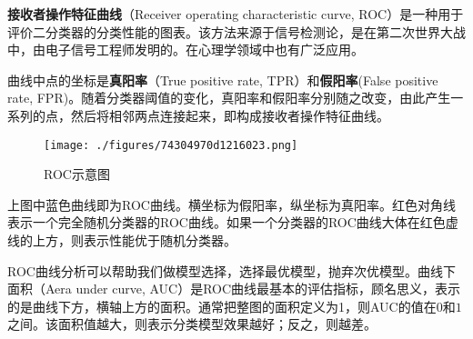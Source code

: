 

\textbf{接收者操作特征曲线}（Receiver operating characteristic curve, ROC）是一种用于评价二分类器的分类性能的图表。该方法来源于信号检测论，是在第二次世界大战中，由电子信号工程师发明的。在心理学领域中也有广泛应用。

曲线中点的坐标是\textbf{真阳率}（True positive rate, TPR）和\textbf{假阳率}(False positive rate, FPR)。随着分类器阈值的变化，真阳率和假阳率分别随之改变，由此产生一系列的点，然后将相邻两点连接起来，即构成接收者操作特征曲线。

\begin{figure}[ht]
\centering
\texttt{[image: ./figures/74304970d1216023.png]}
\caption{ROC示意图} \label{fig_ROC_1}
\end{figure}
上图中蓝色曲线即为ROC曲线。横坐标为假阳率，纵坐标为真阳率。红色对角线表示一个完全随机分类器的ROC曲线。如果一个分类器的ROC曲线大体在红色虚线的上方，则表示性能优于随机分类器。

ROC曲线分析可以帮助我们做模型选择，选择最优模型，抛弃次优模型。曲线下面积（Aera under curve, AUC）是ROC曲线最基本的评估指标，顾名思义，表示的是曲线下方，横轴上方的面积。通常把整图的面积定义为1，则AUC的值在$0$和$1$之间。该面积值越大，则表示分类模型效果越好；反之，则越差。
